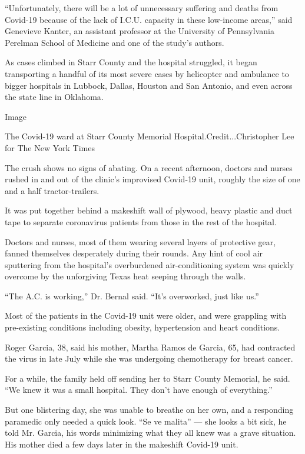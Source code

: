 ``Unfortunately, there will be a lot of unnecessary suffering and deaths
from Covid-19 because of the lack of I.C.U. capacity in these low-income
areas,'' said Genevieve Kanter, an assistant professor at the University
of Pennsylvania Perelman School of Medicine and one of the study's
authors.

As cases climbed in Starr County and the hospital struggled, it began
transporting a handful of its most severe cases by helicopter and
ambulance to bigger hospitals in Lubbock, Dallas, Houston and San
Antonio, and even across the state line in Oklahoma.

Image

The Covid-19 ward at Starr County Memorial Hospital.Credit...Christopher
Lee for The New York Times

The crush shows no signs of abating. On a recent afternoon, doctors and
nurses rushed in and out of the clinic's improvised Covid-19 unit,
roughly the size of one and a half tractor-trailers.

It was put together behind a makeshift wall of plywood, heavy plastic
and duct tape to separate coronavirus patients from those in the rest of
the hospital.

Doctors and nurses, most of them wearing several layers of protective
gear, fanned themselves desperately during their rounds. Any hint of
cool air sputtering from the hospital's overburdened air-conditioning
system was quickly overcome by the unforgiving Texas heat seeping
through the walls.

``The A.C. is working,'' Dr. Bernal said. ``It's overworked, just like
us.''

Most of the patients in the Covid-19 unit were older, and were grappling
with pre-existing conditions including obesity, hypertension and heart
conditions.

Roger Garcia, 38, said his mother, Martha Ramos de Garcia, 65, had
contracted the virus in late July while she was undergoing chemotherapy
for breast cancer.

For a while, the family held off sending her to Starr County Memorial,
he said. ``We knew it was a small hospital. They don't have enough of
everything.''

But one blistering day, she was unable to breathe on her own, and a
responding paramedic only needed a quick look. ``Se ve malita'' --- she
looks a bit sick, he told Mr. Garcia, his words minimizing what they all
knew was a grave situation. His mother died a few days later in the
makeshift Covid-19 unit.

